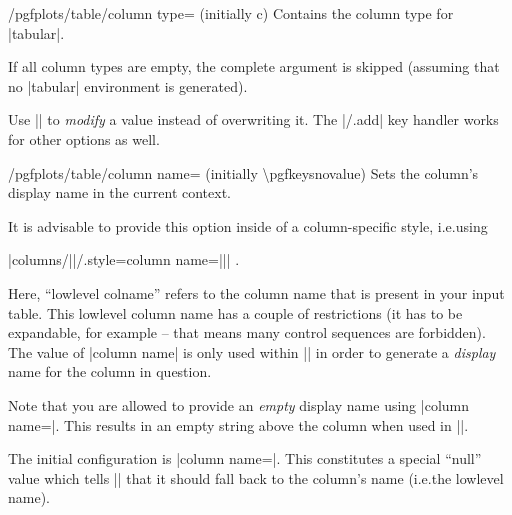 \documentclass[a4paper]{ltxdoc}
\begin{document}
\begin{key}{/pgfplots/table/column type= (initially c)}
    Contains the column type for |tabular|.

    If all column types are empty, the complete argument is skipped (assuming
    that no |tabular| environment is generated).

    Use || to
    \emph{modify} a value instead of overwriting it. The |/.add| key handler
    works for other options as well.
\begin{codeexample}[narrow]
\end{codeexample}
\end{key}

\begin{key}{/pgfplots/table/column name= (initially \textbackslash pgfkeysnovalue)}
    Sets the column's display name in the current context.

    It is advisable to provide this option inside of a column-specific style,
    i.e.\@ using

    |columns/||/.style={column name=||}| .

    Here, ``lowlevel colname'' refers to the column name that is present in
    your input table. This lowlevel column name has a couple of restrictions
    (it has to be expandable, for example -- that means many control sequences
    are forbidden). The value of |column name| is only used within
    |\pgfplotstabletypeset| in order to generate a \emph{display} name for the
    column in question.

    Note that you are allowed to provide an \emph{empty} display name using
    |column name={}|. This results in an empty string above the column when
    used in |\pgfplotstabletypeset|.

    The initial configuration is |column name=\pgfkeysnovalue|. This
    constitutes a special ``null'' value which tells |\pgfplotstabletypeset|
    that it should fall back to the column's name (i.e.\@ the lowlevel name).
\end{key}
\end{document}
